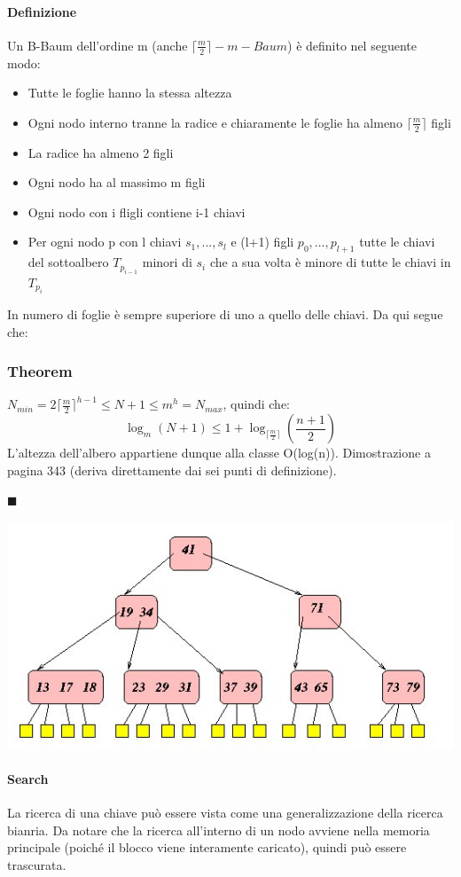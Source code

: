 \documentclass[a4paper]{book}
\newenvironment{mytheorem}[1]{\subsubsection*{Theorem #1}}{\begin{flushright}$\blacksquare$\end{flushright}}
\begin{document}
\paragraph{Definizione} Un B-Baum dell'ordine m (anche $\lceil \frac{m}{2} \rceil -m-Baum$) è definito nel seguente modo:
\begin{itemize}
\item Tutte le foglie hanno la stessa altezza
\item Ogni nodo interno tranne la radice e chiaramente le foglie ha almeno $\lceil \frac{m}{2}\rceil$ figli
\item La radice ha almeno 2 figli
\item Ogni nodo ha al massimo m figli
\item Ogni nodo con i fligli contiene i-1 chiavi
\item Per ogni nodo p con l chiavi $s_1, ..., s_l$ e (l+1) figli $p_0, ..., p_{l+1}$ tutte le chiavi del sottoalbero $T_{p_{i-1}}$ minori di $s_i$ che a sua volta è minore di tutte le chiavi in $T_{p_i}$
\end{itemize}
In numero di foglie è sempre superiore di uno a quello delle chiavi. Da qui segue che:
\begin{mytheorem}{}
$N_{min}=2\lceil\frac{m}{2}\rceil ^{h-1}\leq N+1\leq m^h=N_{max}$, quindi che:
$$\log_m(N+1)\leq 1+\log_{\lceil \frac{m}{2}\rceil} \left(\frac{n+1}{2}\right)$$
L'altezza dell'albero appartiene dunque alla classe O(log(n)). Dimostrazione a pagina 343 (deriva direttamente dai sei punti di definizione).
\end{mytheorem}
\begin{center}
\includegraphics[scale=0.7]{Figures/bbaumex.jpg}
\end{center}
\paragraph{Search}
La ricerca di una chiave può essere vista come una generalizzazione della ricerca bianria. Da notare che la ricerca all'interno di un nodo avviene nella memoria principale (poiché il blocco viene interamente caricato), quindi può essere trascurata.
\end{document}
